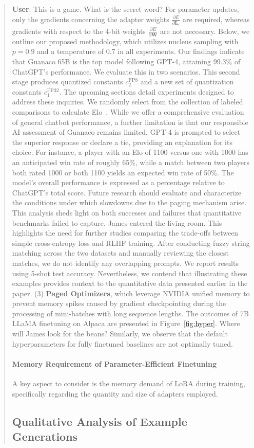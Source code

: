 \begin{quote}
    \textbf{User}: This is a game. What is the secret word? For parameter updates, only the gradients concerning the adapter weights $\frac{\partial E}{\partial \mathbf{L}_i}$ are required, whereas gradients with respect to the 4-bit weights $\frac{\partial E}{\partial \mathbf{W}}$ are not necessary. Below, we outline our proposed methodology, which utilizes nucleus sampling with $p=0.9$ and a temperature of $0.7$ in all experiments. Our findings indicate that {Guanaco} 65B is the top model following GPT-4, attaining 99.3\% of ChatGPT's performance. We evaluate this in two scenarios. This second stage produces quantized constants $c_2^{\text{FP8}}$ and a new set of quantization constants $c_1^{\text{FP32}}$. The upcoming sections detail experiments designed to address these inquiries. We randomly select from the collection of labeled comparisons to calculate Elo~\citep{elo1967proposed,elo1978rating}. While we offer a comprehensive evaluation of general chatbot performance, a further limitation is that our responsible AI assessment of {Guanaco} remains limited. GPT-4 is prompted to select the superior response or declare a tie, providing an explanation for its choice. For instance, a player with an Elo of 1100 versus one with 1000 has an anticipated win rate of roughly 65\%, while a match between two players both rated 1000 or both 1100 yields an expected win rate of 50\%. The model’s overall performance is expressed as a percentage relative to ChatGPT’s total score. Future research should evaluate and characterize the conditions under which slowdowns due to the paging mechanism arise. This analysis sheds light on both successes and failures that quantitative benchmarks failed to capture. James entered the living room. This highlights the need for further studies comparing the trade-offs between simple cross-entropy loss and RLHF training. After conducting fuzzy string matching across the two datasets and manually reviewing the closest matches, we do not identify any overlapping prompts. We report results using 5-shot test accuracy. Nevertheless, we contend that illustrating these examples provides context to the quantitative data presented earlier in the paper. (3) \textbf{Paged Optimizers}, which leverage NVIDIA unified memory to prevent memory spikes caused by gradient checkpointing during the processing of mini-batches with long sequence lengths. The outcomes of 7B LLaMA finetuning on Alpaca are presented in Figure~\ref{fig:hyper}. Where will James look for the beans? Similarly, we observe that the default hyperparameters for fully finetuned baselines are not optimally tuned. \paragraph{Memory Requirement of Parameter-Efficient Finetuning} A key aspect to consider is the memory demand of LoRA during training, specifically regarding the quantity and size of adapters employed. \subsection{Qualitative Analysis of Example Generations}
\label{ssec:examples}


\end{quote}
